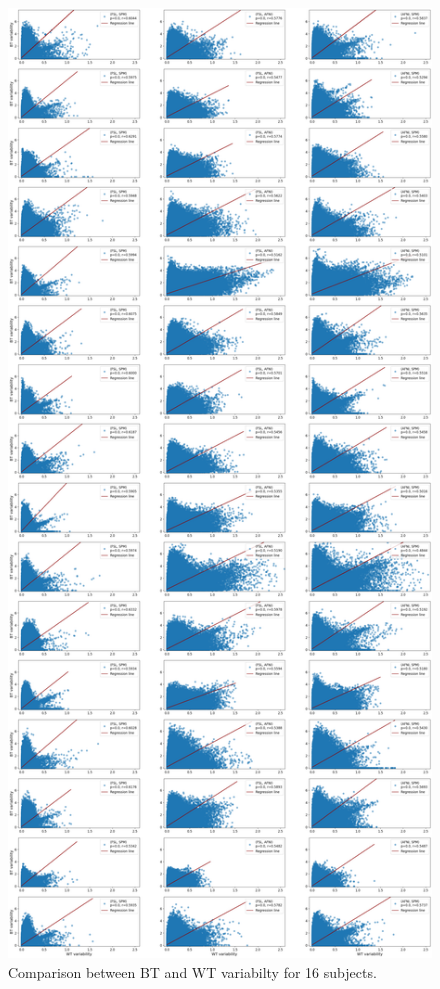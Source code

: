 \documentclass[11pt,onecolumn]{article}
\begin{document}
\begin{figure}[ht]
  \centering
  \includegraphics[width=.6\textwidth]{figures/sbj-abs-corr-unthresh-plot.png}
  \caption{Comparison between BT and WT variabilty for 16 subjects.}
  \label{fig:unthresh-correlation-allsbj}
\end{figure}
\end{document}
